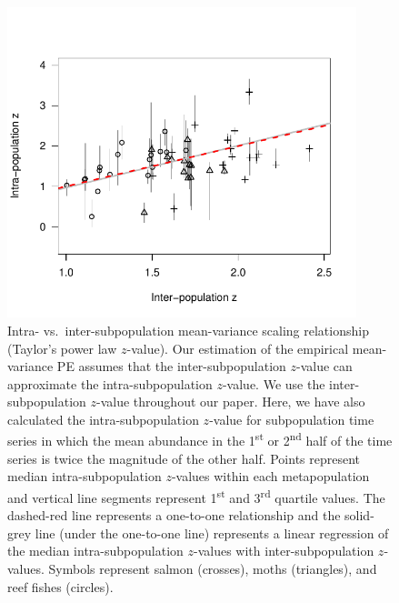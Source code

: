 \begin{figure}[htbp]
  \centering
  \includegraphics[width=4in]{prophets/inter-vs-intra-pop-z-seg-2-0-20121019.pdf}
  \caption{ Intra- vs.\ inter-subpopulation mean-variance scaling relationship
    (Taylor's power law $z$-value).  Our estimation of the empirical
    mean-variance PE assumes that the inter-subpopulation $z$-value can
    approximate the intra-subpopulation $z$-value.  We use the
    inter-subpopulation $z$-value throughout our paper.  Here, we have also
    calculated the intra-subpopulation $z$-value for subpopulation time series
    in which the mean abundance in the 1\textsuperscript{st} or
    2\textsuperscript{nd} half of the time series is twice the magnitude of
    the other half.  Points represent median intra-subpopulation $z$-values
    within each metapopulation and vertical line segments represent
    1\textsuperscript{st} and 3\textsuperscript{rd} quartile values.  The
    dashed-red line represents a one-to-one relationship and the solid-grey
    line (under the one-to-one line) represents a linear regression of the
    median intra-subpopulation $z$-values with inter-subpopulation $z$-values.
    Symbols represent salmon (crosses), moths (triangles), and reef fishes
    (circles).}
  \label{fig:inter-vs-intra-z}
\end{figure}


